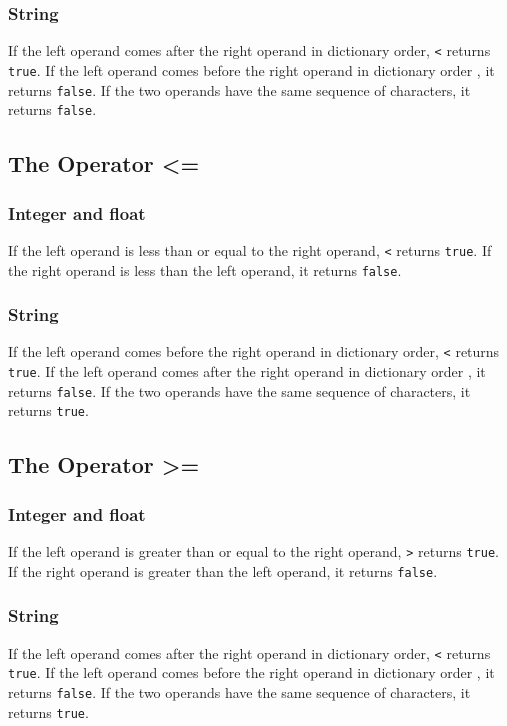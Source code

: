 \subsubsection{String}
If the left operand comes after the right operand in dictionary order, \verb!<! returns \verb!true!. If the left operand comes before the right operand in dictionary order , it returns \verb!false!. If the two operands have the same sequence of characters, it returns \verb!false!.

\subsection{The Operator <=}
\subsubsection{Integer and float}
If the left operand is less than or equal to the right operand, \verb!<! returns \verb!true!. If the right operand is less than the left operand, it returns \verb!false!.
\subsubsection{String}
If the left operand comes before the right operand in dictionary order, \verb!<! returns \verb!true!. If the left operand comes after the right operand in dictionary order , it returns \verb!false!. If the two operands have the same sequence of characters, it returns \verb!true!.

\subsection{The Operator >=}
\subsubsection{Integer and float}
If the left operand is greater than or equal to the right operand, \verb!>! returns \verb!true!. If the right operand is greater than the left operand, it returns \verb!false!.
\subsubsection{String}
If the left operand comes after the right operand in dictionary order, \verb!<! returns \verb!true!. If the left operand comes before the right operand in dictionary order , it returns \verb!false!. If the two operands have the same sequence of characters, it returns \verb!true!.

